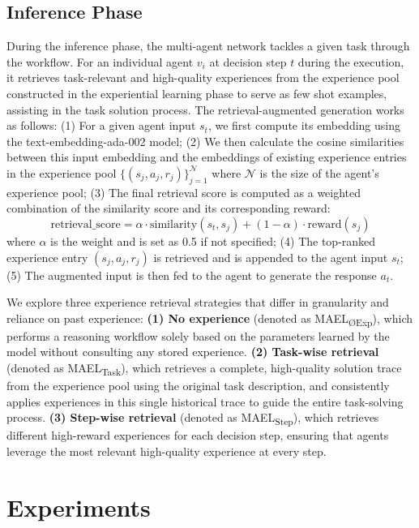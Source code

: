 \documentclass[preprint]{article}
\begin{document}
\subsection{Inference Phase}
\label{sec:inference}
During the inference phase, the multi-agent network tackles a given task through the workflow.
For an individual agent $v_i$ at decision step $t$ during the execution, it retrieves task-relevant and high-quality experiences from the experience pool constructed in the experiential learning phase to serve as few shot examples, assisting in the task solution process.
The retrieval-augmented generation works as follows:
(1) For a given agent input $s_t$, we first compute its embedding using the text-embedding-ada-002 model;
(2) We then calculate the cosine similarities between this input embedding and the embeddings of existing experience entries in the experience pool $\{(s_j, a_j, r_j)\}_{j=1}^{\mathcal{N}}$ where $\mathcal{N}$ is the size of the agent's experience pool;
(3) The final retrieval score is computed as a weighted combination of the similarity score and its corresponding reward:
\begin{equation}
\mathrm{retrieval\_score} = \alpha \cdot \mathrm{similarity}(s_t, s_j) + (1-\alpha) \cdot \mathrm{reward}(s_j) \label{eq:scoring}
\end{equation}
where $\alpha$ is the weight and is set as 0.5 if not specified;
(4) The top-ranked experience entry $(s_j, a_j, r_j)$ is retrieved and is appended to the agent input $s_t$; 
(5) The augmented input is then fed to the agent to generate the response $a_t$.

We explore three experience retrieval strategies that differ in granularity and reliance on past experience:
\textbf{ (1) No experience} (denoted as MAEL\textsubscript{ØExp}), which performs a reasoning workflow solely based on the parameters learned by the model without consulting any stored experience.
\textbf{(2) Task-wise retrieval} (denoted as MAEL\textsubscript{Task}), which retrieves a complete, high-quality solution trace from the experience pool using the original task description, and consistently applies experiences in this single historical trace to guide the entire task-solving process.
\textbf{(3) Step-wise retrieval} (denoted as MAEL\textsubscript{Step}), which retrieves different high-reward experiences for each decision step, ensuring that agents leverage the most relevant high-quality experience at every step.


\section{Experiments}
\label{sec:experiment}
\end{document}
